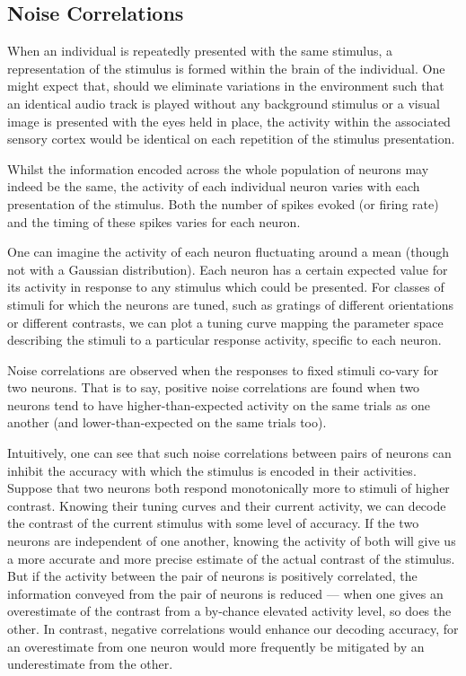 \subsection{Noise Correlations}
\label{sec:bg-noisecorr}

When an individual is repeatedly presented with the same stimulus, a representation of the stimulus is formed within the brain of the individual.
One might expect that, should we eliminate variations in the environment such that an identical audio track is played without any background stimulus or a visual image is presented with the eyes held in place, the activity within the associated sensory cortex would be identical on each repetition of the stimulus presentation.

Whilst the information encoded across the whole population of neurons may indeed be the same, the activity of each individual neuron varies with each presentation of the stimulus.
Both the number of spikes evoked (or firing rate) and the timing of these spikes varies for each neuron. 

One can imagine the activity of each neuron fluctuating around a mean (though not with a Gaussian distribution).
Each neuron has a certain expected value for its activity in response to any stimulus which could be presented.
For classes of stimuli for which the neurons are tuned, such as gratings of different orientations or different contrasts, we can plot a tuning curve mapping the parameter space describing the stimuli to a particular response activity, specific to each neuron.

Noise correlations are observed when the responses to fixed stimuli co-vary for two neurons.
That is to say, positive noise correlations are found when two neurons tend to have higher-than-expected activity on the same trials as one another (and lower-than-expected on the same trials too).

Intuitively, one can see that such noise correlations between pairs of neurons can inhibit the accuracy with which the stimulus is encoded in their activities.
Suppose that two neurons both respond monotonically more to stimuli of higher contrast.
Knowing their tuning curves and their current activity, we can decode the contrast of the current stimulus with some level of accuracy.
If the two neurons are independent of one another, knowing the activity of both will give us a more accurate and more precise estimate of the actual contrast of the stimulus.
But if the activity between the pair of neurons is positively correlated, the information conveyed from the pair of neurons is reduced --- when one gives an overestimate of the contrast from a by-chance elevated activity level, so does the other.
In contrast, negative correlations would enhance our decoding accuracy, for an overestimate from one neuron would more frequently be mitigated by an underestimate from the other.

